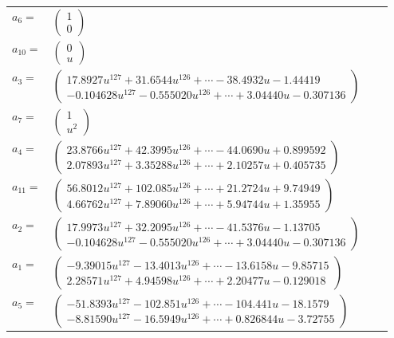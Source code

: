 \documentclass[1p]{elsarticle_modified}
\theoremstyle{definition}
\begin{document}
\begin{tabular}{m{7pt} m{180pt} m{7pt} m{180pt} }
\flushright $a_{6}=$&$\begin{pmatrix}1\\0\end{pmatrix}$ \\
\flushright $a_{10}=$&$\begin{pmatrix}0\\u\end{pmatrix}$ \\
\flushright $a_{3}=$&$\begin{pmatrix}17.8927 u^{127}+31.6544 u^{126}+\cdots-38.4932 u-1.44419\\-0.104628 u^{127}-0.555020 u^{126}+\cdots+3.04440 u-0.307136\end{pmatrix}$ \\
\flushright $a_{7}=$&$\begin{pmatrix}1\\u^2\end{pmatrix}$ \\
\flushright $a_{4}=$&$\begin{pmatrix}23.8766 u^{127}+42.3995 u^{126}+\cdots-44.0690 u+0.899592\\2.07893 u^{127}+3.35288 u^{126}+\cdots+2.10257 u+0.405735\end{pmatrix}$ \\
\flushright $a_{11}=$&$\begin{pmatrix}56.8012 u^{127}+102.085 u^{126}+\cdots+21.2724 u+9.74949\\4.66762 u^{127}+7.89060 u^{126}+\cdots+5.94744 u+1.35955\end{pmatrix}$ \\
\flushright $a_{2}=$&$\begin{pmatrix}17.9973 u^{127}+32.2095 u^{126}+\cdots-41.5376 u-1.13705\\-0.104628 u^{127}-0.555020 u^{126}+\cdots+3.04440 u-0.307136\end{pmatrix}$ \\
\flushright $a_{1}=$&$\begin{pmatrix}-9.39015 u^{127}-13.4013 u^{126}+\cdots-13.6158 u-9.85715\\2.28571 u^{127}+4.94598 u^{126}+\cdots+2.20477 u-0.129018\end{pmatrix}$ \\
\flushright $a_{5}=$&$\begin{pmatrix}-51.8393 u^{127}-102.851 u^{126}+\cdots-104.441 u-18.1579\\-8.81590 u^{127}-16.5949 u^{126}+\cdots+0.826844 u-3.72755\end{pmatrix}$ \\

\end{tabular}
\end{document}
